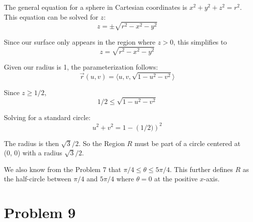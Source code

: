 \documentclass{article}
\begin{document}
The general equation for a sphere in Cartesian coordinates is $x^2 + y^2 + z^2 =
r^2$. This equation can be solved for $z$:
$$ z = \pm \sqrt{r^2 - x^2 - y^2} $$

Since our surface only appears in the region where $z > 0$, this simplifies to 
$$ z = \sqrt{r^2 - x^2 - y^2} $$

Given our radius is 1, the parameterization follows:
$$ \vec{r}(u, v) = \langle u, v, \sqrt{1 - u^2 - v^2} \rangle $$

Since $z \geq 1/2$, 
$$ 1 / 2 \leq \sqrt{1 - u^2 - v^2} $$

Solving for a standard circle:
$$u^2 + v^2 = 1 - \left(1/2)\right)^2 $$

The radius is then $\sqrt{3} / 2$. So the Region $R$ must be part of a circle
centered at (0, 0) with a radius $\sqrt{3} / 2$.

\bigbreak

We also know from the Problem 7 that $\pi / 4 \leq \theta \leq  5 \pi / 4$. This
further defines $R$ as the half-circle between $\pi / 4$ and $5 \pi / 4$ where
$\theta = 0$ at the positive $x$-axis.

\section*{Problem 9}
\end{document}
